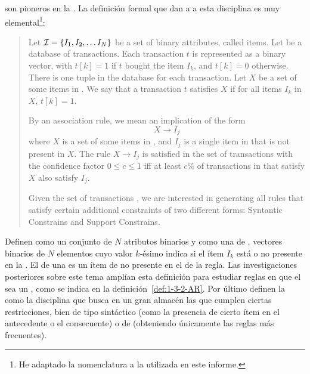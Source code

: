 \citet{AgrawalImielinskiSwami-MiningAssociationRulesBetweenSetsOfItemsInLargeDB-1993} son pioneros en la \arm. La definición formal que dan a a esta disciplina es muy elemental\footnote{He adaptado la nomenclatura a la utilizada en este informe.}:

\begin{quote}
  Let $\I = \{I_1, I_2, \ldots I_N\}$ be a set of binary attributes, called items. Let \D be a database of transactions. Each transaction $t$ is represented as a binary vector, with $t[k] = 1$ if $t$ bought the item $I_k$, and $t[k] = 0$ otherwise. There is one tuple in the database for each transaction. Let $X$ be a set of some items in \I. We say that a transaction $t$ satisfies $X$ if for all items $I_k$ in $X$, $t[k] = 1$.
  
  By an association rule, we mean an implication of the form 
  $$X \rightarrow I_j$$
  where $X$ is a set of some items in \I, and $I_j$ is a single item in \I that is not present in $X$. The rule $X \rightarrow I_j$ is satisfied in the set of transactions \D with the confidence factor $0 \leq c \leq 1$ iff at least $c\%$ of transactions in \D that satisfy $X$ also satisfy $I_j$.
  
  Given the set of transactions \D, we are interested in generating all rules that satisfy certain additional constraints of two different forms: Syntantic Constrains and Support Constrains.
\end{quote}

Definen \I como un conjunto de $N$ atributos binarios y \D como una \db de \transacciones, vectores binarios de $N$ elementos cuyo valor $k$-ésimo indica si el ítem $I_k$ está o no presente en la \transaccion. El \consecuente de una \AR es un ítem de \I no presente en el \antecedente de la regla. Las investigaciones posteriores sobre este tema amplían esta definición para estudiar reglas en que el \consecuente sea un \kitemset, como se indica en la definición~\ref{def:1-3-2-AR}. Por último definen la \arm como la disciplina que busca en un gran almacén \D las \ARs que cumplen ciertas restricciones, bien de tipo sintáctico (como la presencia de cierto ítem en el antecedente o el consecuente) o de \soporte (obteniendo únicamente las reglas más frecuentes).

